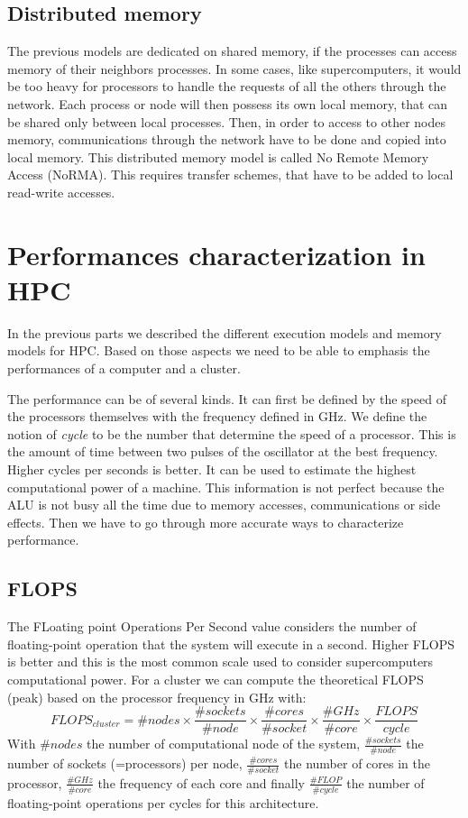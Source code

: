 \subsection{Distributed memory}
The previous models are dedicated on shared memory, if the processes can access memory of their neighbors processes. 
In some cases, like supercomputers, it would be too heavy for processors to handle the requests of all the others through the network. 
Each process or node will then possess its own local memory, that can be shared only between local processes. 
Then, in order to access to other nodes memory, communications through the network have to be done and copied into local memory. 
This distributed memory model is called No Remote Memory Access (NoRMA).
This requires transfer schemes, that have to be added to local read-write accesses.

\section{Performances characterization in HPC}
In the previous parts we described the different execution models and memory models for HPC. 
Based on those aspects we need to be able to emphasis the performances of a computer and a cluster. 

The performance can be of several kinds. 
It can first be defined by the speed of the processors themselves with the frequency defined in GHz. 
We define the notion of \textit{cycle} to be the number that determine the speed of a processor. 
This is the amount of time between two pulses of the oscillator at the best frequency. 
Higher cycles per seconds is better. 
It can be used to estimate the highest computational power of a machine. 
This information is not perfect because the ALU is not busy all the time due to memory accesses, communications or side effects. 
Then we have to go through more accurate ways to characterize performance.

\subsection{FLOPS}


The FLoating point Operations Per Second value considers the number of floating-point operation that the system will execute in a second. 
Higher FLOPS is better and this is the most common scale used to consider supercomputers computational power. 
For a cluster we can compute the theoretical FLOPS (peak) based on the processor frequency in GHz with:
\begin{equation}
FLOPS_{cluster} = \#nodes \times \frac{\#sockets}{\#node} \times \frac{\#cores}{\#socket} \times \frac{\#GHz}{\#core} \times \frac{FLOPS}{cycle}
\end{equation}
With $\#nodes$ the number of computational node of the system, $\frac{\#sockets}{\#node}$ the number of sockets (=processors) per node, $\frac{\#cores}{\#socket}$ the number of cores in the processor, $\frac{\#GHz}{\#core}$ the frequency of each core and finally $\frac{\#FLOP}{\#cycle}$ the number of floating-point operations per cycles for this architecture. 


